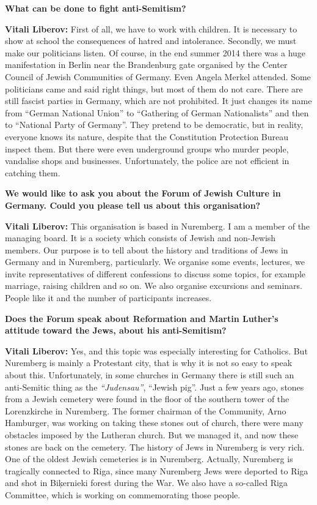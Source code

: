 \textbf{What can be done to fight anti-Semitism?} 

\textbf{Vitali Liberov:} First of all, we have to work with children. It is necessary to show at school the consequences of hatred and intolerance. Secondly, we must make our politicians listen. Of course, in the end summer 2014 there was a huge manifestation in Berlin near the Brandenburg gate organised by the Center Council of Jewish Communities of Germany. Even Angela Merkel attended. Some politicians came and said right things, but most of them do not care. There are still fascist parties in Germany, which are not prohibited. It just changes its name from ``German National Union'' to ``Gathering of German Nationalists'' and then to ``National Party of Germany''. They pretend to be democratic, but in reality, everyone knows its nature, despite that the Constitution Protection Bureau inspect them. But there were even underground groups who murder people, vandalise shops and businesses. Unfortunately, the police are not efficient in catching them. 

\textbf{We would like to ask you about the Forum of Jewish Culture in Germany. Could you please tell us about this organisation?}  

\textbf{Vitali Liberov:} This organisation is based in Nuremberg. I am a member of the managing board. It is a society which consists of Jewish and non-Jewish members. Our purpose is to tell about the history and traditions of Jews in Germany and in Nuremberg, particularly. We organise some events, lectures, we invite representatives of different confessions to discuss some topics, for example marriage, raising children and so on. We also organise excursions and seminars. People like it and the number of participants increases.  

\textbf{Does the Forum speak about Reformation and Martin Luther’s attitude toward the Jews, about his anti-Semitism?} 

\textbf{Vitali Liberov:} Yes, and this topic was especially interesting for Catholics. But Nuremberg is mainly a Protestant city, that is why it is not so easy to speak about this. Unfortunately, in some churches in Germany there is still such an anti-Semitic thing as the \textit{``Judensau''}, ``Jewish pig''. Just a few years ago, stones from a Jewish cemetery were found in the floor of the southern tower of the Lorenzkirche in Nuremberg. The former chairman of the Community, Arno Hamburger, was working on taking these stones out of church, there were many obstacles imposed by the Lutheran church. But we managed it, and now these stones are back on the cemetery. The history of Jews in Nuremberg is very rich. One of the oldest Jewish cemeteries is in Nuremberg. Actually, Nuremberg is tragically connected to Riga, since many Nuremberg Jews were deported to Riga and shot in Biķernieki forest during the War. We also have a so-called Riga Committee, which is working on commemorating those people.